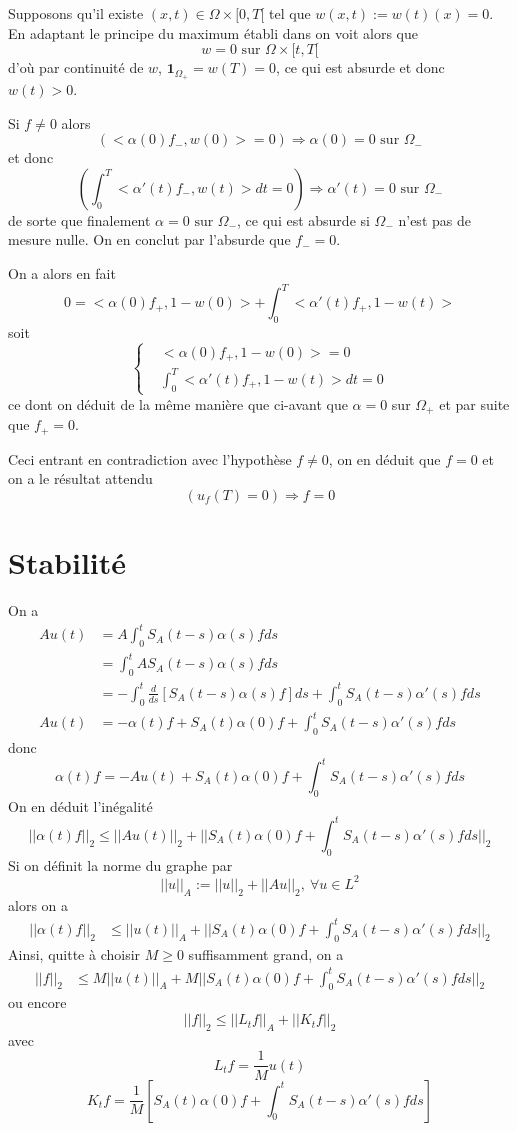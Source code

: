 \documentclass[a4paper]{book}
\begin{document}
Supposons qu'il existe $(x,t)\in\Omega \times [0,T[$ tel que $w(x,t):=w(t)(x)=0$. En adaptant le principe du maximum établi dans \cite{PDEPT} on voit alors que
\[w=0 \text{ sur }\Omega\times[t,T[ \]
d'où par continuité de $w$, $\mathbf{1}_{\Omega_+}=w(T)=0$, ce qui est absurde et donc $w(t)>0$.

Si $f\neq 0$ alors
\[\left(<\alpha(0)f_-,w(0)>=0 \right)\Longrightarrow \alpha(0)=0 \text{ sur } \Omega_- \]
et donc
\[\left(\int_{0}^{T}<\alpha'(t)f_-,w(t)>dt=0\right)\Longrightarrow \alpha'(t)=0\text{ sur } \Omega_- \]
de sorte que finalement $\alpha =0\text{ sur } \Omega_-$, ce qui est absurde si $\Omega_-$ n'est pas de mesure nulle. On en conclut par l'absurde que $f_-=0$.

On a alors en fait
\[0=<\alpha(0)f_+,1-w(0)> + \int_{0}^{T}<\alpha'(t)f_+,1-w(t)>\]
soit
\[\left\lbrace\begin{aligned}
         & <\alpha(0)f_+,1-w(0)>=0                \\
         & \int_{0}^{T}<\alpha'(t)f_+,1-w(t)>dt=0
    \end{aligned}\right. \]
ce dont on déduit de la même manière que ci-avant que $\alpha=0$ sur $\Omega_+$ et par suite que $f_+=0$.

Ceci entrant en contradiction avec l'hypothèse $f\neq 0$, on en déduit que $f=0$ et on a le résultat attendu
\[ \left(u_f(T)=0\right)\Longrightarrow f=0\]
\section{Stabilité}
On a
\[\begin{aligned}
        Au(t) & = A\int_{0}^{t}S_A(t-s)\alpha(s)fds                                                   \\
              & = \int_{0}^{t}AS_A(t-s)\alpha(s)fds                                                   \\
              & = - \int_{0}^{t}\frac{d}{ds}[S_A(t-s)\alpha(s)f]ds +\int_{0}^{t}S_A(t-s)\alpha'(s)fds \\
        Au(t) & = -\alpha(t)f +S_A(t)\alpha(0)f +  \int_{0}^{t}S_A(t-s)\alpha'(s)fds
    \end{aligned} \]
donc
\[\alpha(t)f = -Au(t) + S_A(t)\alpha(0)f +  \int_{0}^{t}S_A(t-s)\alpha'(s)fds\]
On en déduit l'inégalité
\[||\alpha(t)f||_2 \leq ||Au(t)||_2 + ||S_A(t)\alpha(0)f +  \int_{0}^{t}S_A(t-s)\alpha'(s)fds||_2\]
Si on définit la norme du graphe par
\[||u||_A:= ||u||_2 + ||Au||_2,\ \forall u\in L^2 \]
alors on a
\[\begin{aligned}
        ||\alpha(t)f||_2 & \leq||u(t)||_A + ||S_A(t)\alpha(0)f +  \int_{0}^{t}S_A(t-s)\alpha'(s)fds||_2
    \end{aligned}\]
Ainsi, quitte à choisir $M\geq0$ suffisamment grand, on a
\[\begin{aligned}
        ||f||_2 & \leq M||u(t)||_A + M||S_A(t)\alpha(0)f +  \int_{0}^{t}S_A(t-s)\alpha'(s)fds||_2
    \end{aligned}\]
ou encore
\begin{equation}\label{Ht}
    ||f||_2 \leq ||L_tf||_A + ||K_tf||_2
\end{equation}
avec
\[L_tf=\frac{1}{M}u(t) \]
\[K_tf=\frac{1}{M}\left[S_A(t)\alpha(0)f +  \int_{0}^{t}S_A(t-s)\alpha'(s)fds \right] \]
\end{document}
